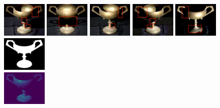  \hfill
 \\
 \includegraphics[width=0.16\textwidth]{ch-psfcn/images/Results/Cast_Shadow/2.5_feat_048_v2.png}
 \includegraphics[width=0.16\textwidth]{ch-psfcn/images/Results/Cast_Shadow/2.5_feat_008_v2.png}
 \includegraphics[width=0.16\textwidth]{ch-psfcn/images/Results/Cast_Shadow/2.5_feat_021_v2.png}
 \includegraphics[width=0.16\textwidth]{ch-psfcn/images/Results/Cast_Shadow/2.5_feat_096_v2.png}
 \includegraphics[width=0.16\textwidth]{ch-psfcn/images/Results/Cast_Shadow/2.5_feat_089_v2.png}
 \hfill
 \includegraphics[width=0.16\textwidth]{ch-psfcn/images/Results/Cast_Shadow/mask.png}
 \\
 \includegraphics[width=0.16\textwidth]{ch-psfcn/images/Results/Cast_Shadow/gobletPNG_0_3.jpg}
